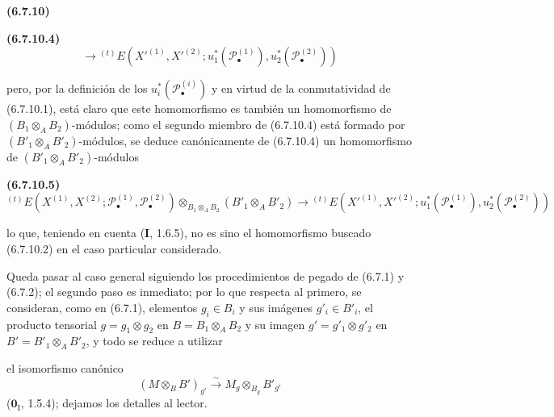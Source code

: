 \documentclass[10pt,oneside]{book}
\newcommand{\oldpage}[2][]{\setcounter{footnote}{0}\marginpar{\scriptsize\textbf{#1}~|~#2}\ignorespaces}
\newenvironment{env}[1][]{\par\medskip\noindent\textbf{(#1)}\ }{\par}
\begin{document}
\begin{env}[6.7.10]
\begin{env}[6.7.10.4]
\[  \longrightarrow
  {}^{(t)}E
  (X'^{(1)},X'^{(2)};
   u_1^*(\mathscr P_\bullet^{(1)}),u_2^*(\mathscr P_\bullet^{(2)}))
  \tag{6.7.10.4}\label{III.6.7.10.4.eq}
\]
\end{env}
pero, por la definición de los $u_i^*(\mathscr P_\bullet^{(i)})$ y en virtud
de la conmutatividad de (6.7.10.1), está claro que este homomorfismo es también
un homomorfismo de $(B_1\otimes_A B_2)$-módulos; como el segundo miembro de
(6.7.10.4) está formado por $(B'_1\otimes_A B'_2)$-módulos, se deduce
canónicamente de (6.7.10.4) un homomorfismo de
$(B'_1\otimes_A B'_2)$-módulos
\begin{env}[6.7.10.5]
\label{III.6.7.10.5}
\[
  {}^{(t)}E
  (X^{(1)},X^{(2)};\mathscr P_\bullet^{(1)},\mathscr P_\bullet^{(2)})
  \otimes_{B_1\otimes_A B_2}(B'_1\otimes_A B'_2)
  \longrightarrow
  {}^{(t)}E
  (X'^{(1)},X'^{(2)};
   u_1^*(\mathscr P_\bullet^{(1)}),u_2^*(\mathscr P_\bullet^{(2)}))
  \tag{6.7.10.5}\label{III.6.7.10.5.eq}
\]
\end{env}
lo que, teniendo en cuenta (\textbf I, 1.6.5), no es sino el homomorfismo buscado
(6.7.10.2) en el caso particular considerado.

Queda pasar al caso general siguiendo los procedimientos de pegado de (6.7.1)
y (6.7.2); el
segundo paso es inmediato; por lo que respecta al primero, se consideran, como
en (6.7.1), elementos $g_i\in B_i$ y sus imágenes $g'_i\in B'_i$, el producto
tensorial $g=g_1\otimes g_2$ en $B=B_1\otimes_A B_2$ y su imagen
$g'=g'_1\otimes g'_2$ en $B'=B'_1\otimes_A B'_2$, y todo se reduce a utilizar

\oldpage[III]{164}
el isomorfismo canónico
\[
  (M\otimes_B B')_{g'}
  \xrightarrow{\sim}
  M_g\otimes_{B_g}B'_{g'}
\]
($\mathbf{0}_{\mathrm I}$, 1.5.4); dejamos los detalles al lector.
\end{env}
\end{document}
